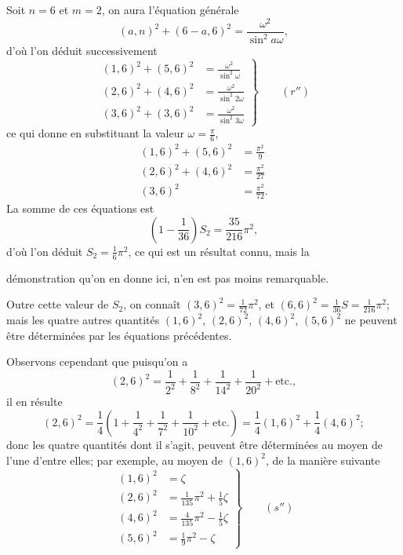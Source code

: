 \documentclass{article}
\begin{document}
Soit $n=6$ et $m=2$, on aura l'équation générale
\[ (a,n)^{2}+(6-a,6)^{2}=\frac{\omega^{2}}{\sin^{2}a\omega}, \]
d'où l'on déduit successivement
\[ \left.\begin{aligned} (1,6)^{2}+(5,6)^{2}&=\frac{\omega^{2}}{\sin^{2}\omega}\\ (2,6)^{2}+(4,6)^{2}&=\frac{\omega^{2}}{\sin^{2}2\omega}\\ (3,6)^{2}+(3,6)^{2}&=\frac{\omega^{2}}{\sin^{2}3\omega} \end{aligned}\right\}\qquad(r'') \]
ce qui donne en substituant la valeur $\omega=\frac{\pi}{6}$,
\[ \begin{aligned} (1,6)^{2}+(5,6)^{2}&=\frac{\pi^{2}}{9}\\ (2,6)^{2}+(4,6)^{2}&=\frac{\pi^{2}}{27}\\ (3,6)^{2}&=\frac{\pi^{2}}{72}. \end{aligned} \]
La somme de ces équations est
\[ \left(1-\frac{1}{36}\right)S_{2}=\frac{35}{216}\pi^{2}, \]
d'où l'on déduit $S_{2}=\frac{1}{6}\pi^{2}$, ce qui est un résultat connu, mais la

démonstration qu'on en donne ici, n'en est pas moins remarquable.

Outre cette valeur de $S_{2}$, on connaît $(3,6)^{2}=\frac{1}{72}\pi^{2}$, et $(6,6)^{2}=\frac{1}{36}S=\frac{1}{216}\pi^{2}$; mais les quatre autres quantités $(1,6)^{2}$, $(2,6)^{2}$, $(4,6)^{2}$, $(5,6)^{2}$ ne peuvent être déterminées par les équations précédentes.

Observons cependant que puisqu'on a
\[ (2,6)^{2}=\frac{1}{2^{2}}+\frac{1}{8^{2}}+\frac{1}{14^{2}}+\frac{1}{20^{2}}+\text{etc.}, \]
il en résulte
\[ (2,6)^{2}=\frac{1}{4}\left(1+\frac{1}{4^{2}}+\frac{1}{7^{2}}+\frac{1}{10^{2}}+\text{etc.}\right)=\frac{1}{4}(1,6)^{2}+\frac{1}{4}(4,6)^{2}; \]
donc les quatre quantités dont il s'agit, peuvent être déterminées au moyen de l'une d'entre elles; par exemple, au moyen de $(1,6)^{2}$, de la manière suivante
\[ \left.\begin{aligned} (1,6)^{2}&=\zeta\\ (2,6)^{2}&=\frac{1}{135}\pi^{2}+\frac{1}{5}\zeta\\ (4,6)^{2}&=\frac{4}{135}\pi^{2}-\frac{1}{5}\zeta\\ (5,6)^{2}&=\frac{1}{9}\pi^{2}-\zeta \end{aligned}\right\}\qquad(s'') \]
\end{document}
